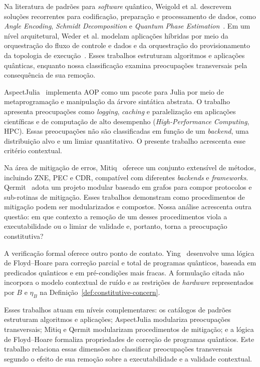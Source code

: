 \documentclass[sigconf]{acmart}
\begin{document}
Na literatura de padrões para \textit{software} quântico, Weigold et al. descrevem soluções recorrentes para codificação, preparação e processamento de dados, como \textit{Angle Encoding}, \textit{Schmidt Decomposition} e \textit{Quantum Phase Estimation}~\cite{weigold2021}. Em um nível arquitetural, Weder et al. modelam aplicações híbridas por meio da orquestração do fluxo de controle e dados e da orquestração do provisionamento da topologia de execução~\cite{weder2021}. Esses trabalhos estruturam algoritmos e aplicações quânticas, enquanto nossa classificação examina preocupações transversais pela consequência de sua remoção.

AspectJulia~\cite{ishimura2024} implementa AOP como um pacote para Julia por meio de metaprogramação e manipulação da árvore sintática abstrata. O trabalho apresenta preocupações como \textit{logging}, \textit{caching} e paralelização em aplicações científicas e de computação de alto desempenho (\textit{High-Performance Computing}, HPC). Essas preocupações não são classificadas em função de um \textit{backend}, uma distribuição alvo e um limiar quantitativo. O presente trabalho acrescenta esse critério contextual.

Na área de mitigação de erros, Mitiq~\cite{larose2022} oferece um conjunto extensível de métodos, incluindo ZNE, PEC e CDR, compatível com diferentes \textit{backends} e \textit{frameworks}. Qermit~\cite{qermit} adota um projeto modular baseado em grafos para compor protocolos e sub-rotinas de mitigação. Esses trabalhos demonstram como procedimentos de mitigação podem ser modularizados e compostos. Nossa análise acrescenta outra questão: em que contexto a remoção de um desses procedimentos viola a executabilidade ou o limiar de validade e, portanto, torna a preocupação constitutiva?

A verificação formal oferece outro ponto de contato. Ying~\cite{hoare_quantum} desenvolve uma lógica de Floyd--Hoare para correção parcial e total de programas quânticos, baseada em predicados quânticos e em pré-condições mais fracas. A formulação citada não incorpora o modelo contextual de ruído e as restrições de \textit{hardware} representados por $B$ e $\eta_B$ na Definição~\ref{def:constitutive-concern}.

Esses trabalhos atuam em níveis complementares: os catálogos de padrões estruturam algoritmos e aplicações; AspectJulia modulariza preocupações transversais; Mitiq e Qermit modularizam procedimentos de mitigação; e a lógica de Floyd--Hoare formaliza propriedades de correção de programas quânticos. Este trabalho relaciona essas dimensões ao classificar preocupações transversais segundo o efeito de sua remoção sobre a executabilidade e a validade contextual.
\end{document}
